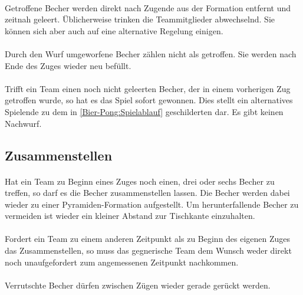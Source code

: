 \paragraph{}
Getroffene Becher werden direkt nach Zugende aus der Formation entfernt und zeitnah geleert.
Üblicherweise trinken die Teammitglieder abwechselnd.
Sie können sich aber auch auf eine alternative Regelung einigen.

\paragraph{}
Durch den Wurf umgeworfene Becher zählen nicht als getroffen.
Sie werden nach Ende des Zuges wieder neu befüllt.

\paragraph{}
Trifft ein Team einen noch nicht geleerten Becher, der in einem vorherigen Zug getroffen wurde, so hat es das Spiel sofort gewonnen.
Dies stellt ein alternatives Spielende zu dem in \ref{Bier-Pong:Spielablauf} geschilderten dar.
Es gibt keinen Nachwurf.

\subsection{Zusammenstellen}
\paragraph{}
Hat ein Team zu Beginn eines Zuges noch einen, drei oder sechs Becher zu treffen, so darf es die Becher zusammenstellen lassen.
Die Becher werden dabei wieder zu einer Pyramiden-Formation aufgestellt.
Um herunterfallende Becher zu vermeiden ist wieder ein kleiner Abstand zur Tischkante einzuhalten.

\paragraph{}
Fordert ein Team zu einem anderen Zeitpunkt als zu Beginn des eigenen Zuges das Zusammenstellen, so muss das gegnerische Team dem Wunsch weder direkt noch unaufgefordert zum angemessenen Zeitpunkt nachkommen.

\paragraph{}
Verrutschte Becher dürfen zwischen Zügen wieder gerade gerückt werden.

